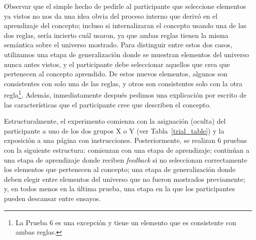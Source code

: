 Observar que el simple hecho de pedirle al participante que seleccione elementos ya vistos no nos da una idea obvia del proceso interno que derivó en el aprendizaje del concepto; incluso si internalizaran el concepto usando una de las dos reglas, sería incierto cuál usaron, ya que ambas reglas tienen la misma semántica sobre el universo mostrado. Para distinguir entre estos dos casos, utilizamos una etapa de generalización donde se muestran elementos del universo nunca antes vistos, y el participante debe seleccionar aquellos que crea que pertenecen al concepto aprendido. De estos nuevos elementos, algunos son consistentes con solo una de las reglas, y otros son consistentes solo con la otra regla\footnote{La Prueba 6 es una excepción y tiene un elemento que es consistente con ambas reglas.}. Además, inmediatamente después pedimos una explicación por escrito de las características que el participante cree que describen el concepto.

Estructuralmente, el experimento comienza con la asignación (oculta) del participante a uno de los dos grupos X o Y (ver Tabla~\ref{trial_table}) y la exposición a una página con instrucciones.
Posteriormente, se realizan 6 pruebas con la siguiente estructura: comienzan con una etapa de aprendizaje; continúan a una etapa de aprendizaje donde reciben {\em feedback} si no seleccionan correctamente los elementos que pertenecen al concepto; una etapa de generalización donde deben elegir entre elementos del universo que no fueron mostrados previamente; y, en todos menos en la última prueba, una etapa en la que los participantes pueden descansar entre ensayos.

